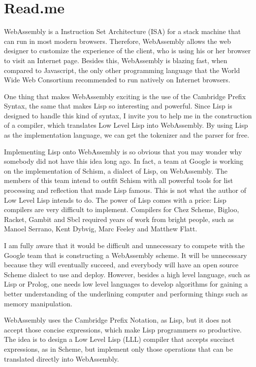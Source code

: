 \documentclass[a4paper,12pt]{book}
\begin{document}
\chapter*{Read.me}

WebAssembly is a Instruction Set Architecture (ISA) for
a stack machine that can run in most modern browsers.
Therefore, WebAssembly allows the web designer to
customize the experience of the client, who is using
his or her browser to visit an Internet page. Besides
this, WebAssembly is blazing fast, when compared to
Javascript, the only other programming language that
the World Wide Web Consortium recommended to run natively
on Internet browsers.

One thing that makes WebAssembly exciting is the use of
the Cambridge Prefix Syntax, the same that makes Lisp
so interesting and powerful. Since Lisp is designed
to handle this kind of syntax, I invite you to help me
in the construction of a compiler, which translates
Low Level Lisp into WebAssembly. By using Lisp as the
implementation language, we can get the tokenizer and
the parser for free.

Implementing Lisp onto WebAssembly is so obvious that you
may wonder why somebody did not have this idea
long ago. In fact, a team at Google is working on
the implementation of Schism, a dialect of Lisp, on
WebAssembly. The members of this team intend to outfit
Schism with all powerful tools for list processing
and reflection that made Lisp famous. This is not what
the author of Low Level Lisp intends to do. The power
of Lisp comes with a price: Lisp compilers are very
difficult to implement. Compilers for Chez Scheme,
Bigloo, Racket, Gambit and Sbcl required years of
work from bright people, such as Manoel Serrano, Kent
Dybvig, Marc Feeley and Matthew Flatt.

I am fully aware that it would be difficult and unnecessary
to compete with the Google team that is constructing a
WebAssembly scheme. It will be unnecessary because they
will eventually succeed, and everybody will have an
open source Scheme dialect to use and deploy. However,
besides a high level language, such as Lisp or Prolog,
one needs low level languages to develop algorithms
for gaining a better understanding of the underlining
computer and performing things such as memory manipulation.

WebAssembly uses the Cambridge Prefix Notation, as Lisp,
but it does not accept those concise expressions, which
make Lisp programmers so productive. The idea is to design
a Low Level Lisp (LLL) compiler that accepts succinct
expressions, as in Scheme, but implement only those
operations that can be translated directly into WebAssembly.
\end{document}
